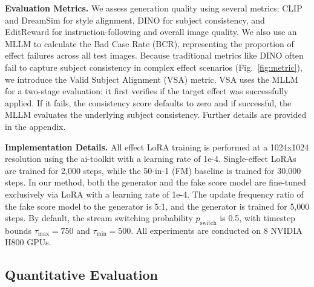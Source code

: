 \documentclass{llmxive}
\begin{document}
\noindent
\textbf{Evaluation Metrics.} We assess generation quality using several metrics: CLIP \cite{clip} and DreamSim \cite{fu2023dreamsimlearningnewdimensions} for style alignment, DINO \cite{zhang2022dinodetrimproveddenoising} for subject consistency, and EditReward \cite{wu2026editrewardhumanalignedrewardmodel} for instruction-following and overall image quality. We also use an MLLM to calculate the Bad Case Rate (BCR), representing the proportion of effect failures across all test images.
Because traditional metrics like DINO often fail to capture subject consistency in complex effect scenarios (Fig.~\ref{fig:metric}), we introduce the Valid Subject Alignment (VSA) metric. VSA uses the MLLM for a two-stage evaluation: it first verifies if the target effect was successfully applied. If it fails, the consistency score defaults to zero and if successful, the MLLM evaluates the underlying subject consistency. Further details are provided in the appendix.

\noindent
\textbf{Implementation Details.} All effect LoRA training is performed at a 1024x1024 resolution using the ai-toolkit \cite{aitookit} with a learning rate of 1e-4. Single-effect LoRAs are trained for 2,000 steps, while the 50-in-1 (FM) baseline is trained for 30,000 steps.
In our method, both the generator and the fake score model are fine-tuned exclusively via LoRA with a learning rate of 1e-4. The update frequency ratio of the fake score model to the generator is 5:1, and the generator is trained for 5,000 steps. By default, the stream switching probability $p_{\text{switch}}$ is 0.5, with timestep bounds $\tau_{\text{max}} = 750$ and $\tau_{\text{min}} = 500$. All experiments are conducted on 8 NVIDIA H800 GPUs.


\vspace{-0.3cm}
\subsection{Quantitative Evaluation}
\label{subsec:quantitative}
\end{document}
